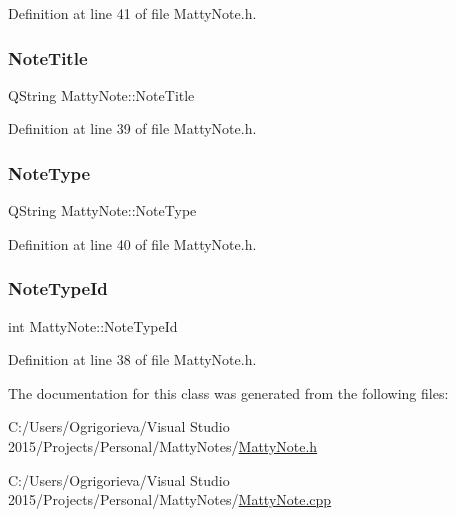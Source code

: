 Definition at line 41 of file Matty\+Note.\+h.

\hypertarget{classMattyNote_a185f1f13eeb93acb237b9db7b4c94229}{}\label{classMattyNote_a185f1f13eeb93acb237b9db7b4c94229} 
\subsubsection{\texorpdfstring{Note\+Title}{NoteTitle}}
{\footnotesize\ttfamily Q\+String Matty\+Note\+::\+Note\+Title\hspace{0.3cm}{\ttfamily [private]}}



Definition at line 39 of file Matty\+Note.\+h.

\hypertarget{classMattyNote_a0b45b382884fac5b651ab1ce155a2c13}{}\label{classMattyNote_a0b45b382884fac5b651ab1ce155a2c13} 
\subsubsection{\texorpdfstring{Note\+Type}{NoteType}}
{\footnotesize\ttfamily Q\+String Matty\+Note\+::\+Note\+Type\hspace{0.3cm}{\ttfamily [private]}}



Definition at line 40 of file Matty\+Note.\+h.

\hypertarget{classMattyNote_ad116cdf301951c8c93ee2a81a0df8647}{}\label{classMattyNote_ad116cdf301951c8c93ee2a81a0df8647} 
\subsubsection{\texorpdfstring{Note\+Type\+Id}{NoteTypeId}}
{\footnotesize\ttfamily int Matty\+Note\+::\+Note\+Type\+Id\hspace{0.3cm}{\ttfamily [private]}}



Definition at line 38 of file Matty\+Note.\+h.



The documentation for this class was generated from the following files\+:\begin{DoxyCompactItemize}
\item 
C\+:/\+Users/\+Ogrigorieva/\+Visual Studio 2015/\+Projects/\+Personal/\+Matty\+Notes/\hyperlink{MattyNote_8h}{Matty\+Note.\+h}\item 
C\+:/\+Users/\+Ogrigorieva/\+Visual Studio 2015/\+Projects/\+Personal/\+Matty\+Notes/\hyperlink{MattyNote_8cpp}{Matty\+Note.\+cpp}\end{DoxyCompactItemize}
